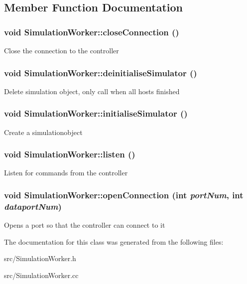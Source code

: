 \subsection{Member Function Documentation}
\hypertarget{classSimulationWorker_aaccde1ec2e77fb934b67718c104e69e8}{
\subsubsection[{closeConnection}]{\setlength{\rightskip}{0pt plus 5cm}void SimulationWorker::closeConnection ()}}
\label{classSimulationWorker_aaccde1ec2e77fb934b67718c104e69e8}
Close the connection to the controller \hypertarget{classSimulationWorker_aa415eb89cba4b39457faed0baa65458c}{
\subsubsection[{deinitialiseSimulator}]{\setlength{\rightskip}{0pt plus 5cm}void SimulationWorker::deinitialiseSimulator ()}}
\label{classSimulationWorker_aa415eb89cba4b39457faed0baa65458c}
Delete simulation object, only call when all hosts finished \hypertarget{classSimulationWorker_aba581c4c9cbdaf10624822e687efd08e}{
\subsubsection[{initialiseSimulator}]{\setlength{\rightskip}{0pt plus 5cm}void SimulationWorker::initialiseSimulator ()}}
\label{classSimulationWorker_aba581c4c9cbdaf10624822e687efd08e}
Create a simulationobject \hypertarget{classSimulationWorker_a18064a1d65824d3c6a522cf68e52e3f5}{
\subsubsection[{listen}]{\setlength{\rightskip}{0pt plus 5cm}void SimulationWorker::listen ()}}
\label{classSimulationWorker_a18064a1d65824d3c6a522cf68e52e3f5}
Listen for commands from the controller \hypertarget{classSimulationWorker_ac8e581d784c84d98db09c3261395d2ed}{
\subsubsection[{openConnection}]{\setlength{\rightskip}{0pt plus 5cm}void SimulationWorker::openConnection (int {\em portNum}, \/  int {\em dataportNum})}}
\label{classSimulationWorker_ac8e581d784c84d98db09c3261395d2ed}
Opens a port so that the controller can connect to it 

The documentation for this class was generated from the following files:\begin{DoxyCompactItemize}
\item 
src/SimulationWorker.h\item 
src/SimulationWorker.cc\end{DoxyCompactItemize}
